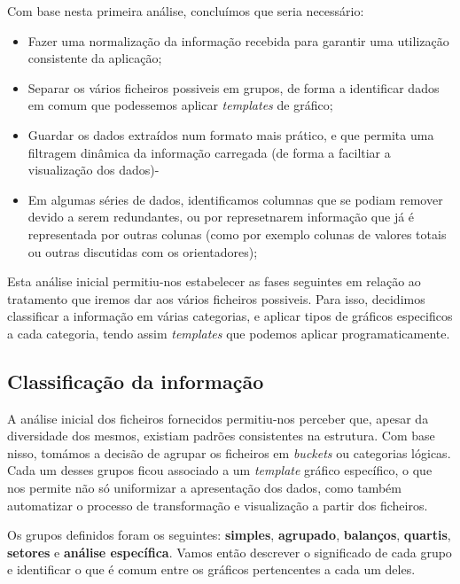 Com base nesta primeira análise, concluímos que seria necessário:
\begin{itemize}
    \item Fazer uma normalização da informação recebida para garantir uma utilização consistente da aplicação;
    \item Separar os vários ficheiros possiveis em grupos, de forma a identificar dados em comum que podessemos aplicar \textit{templates} de gráfico;
    \item Guardar os dados extraídos num formato mais prático, e que permita uma filtragem dinâmica da informação carregada (de forma a faciltiar a visualização dos dados)-
    \item Em algumas séries de dados, identificamos columnas que se podiam remover devido a serem redundantes, ou por represetnarem informação que já é representada por outras colunas (como por exemplo colunas de valores totais ou outras discutidas com os orientadores);
\end{itemize}

Esta análise inicial permitiu-nos estabelecer as fases seguintes em relação ao tratamento que iremos dar aos vários ficheiros possiveis. Para isso, decidimos classificar a informação em várias categorias, e aplicar tipos de gráficos especificos a cada categoria, tendo assim \textit{templates} que podemos aplicar programaticamente. 

\subsection{Classificação da informação}

A análise inicial dos ficheiros fornecidos permitiu-nos perceber que, apesar da diversidade dos mesmos,  existiam padrões consistentes na estrutura. Com base nisso, tomámos a decisão de agrupar os ficheiros em \textit{buckets} ou categorias lógicas. Cada um desses grupos ficou associado a um \textit{template} gráfico específico, o que nos permite não só uniformizar a apresentação dos dados, como também automatizar o processo de transformação e visualização a partir dos ficheiros.

Os grupos definidos foram os seguintes: \textbf{simples}, \textbf{agrupado}, \textbf{balanços}, \textbf{quartis}, \textbf{setores} e \textbf{análise específica}. Vamos então descrever o significado de cada grupo e identificar o que é comum entre os gráficos pertencentes a cada um deles.

